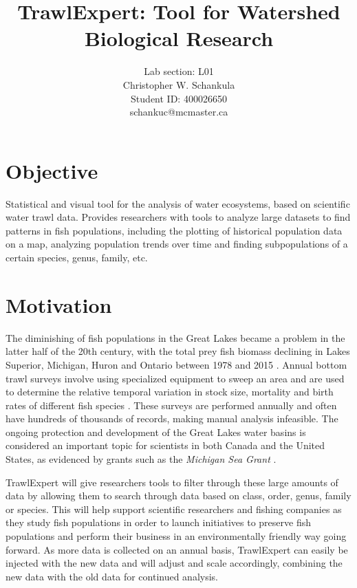 \documentclass{article}
\begin{document}
\title{TrawlExpert: Tool for Watershed Biological Research}
\author{Lab section: L01 \\ Christopher W. Schankula \\Student ID: 400026650 \\schankuc@mcmaster.ca}

\maketitle

\section{Objective}
Statistical and visual tool for the analysis of water ecosystems, based on scientific water trawl data. Provides researchers with tools to analyze large datasets to find patterns in fish populations, including the plotting of historical population data on a map, analyzing population trends over time and finding subpopulations of a certain species, genus, family, etc.

\section{Motivation}
The diminishing of fish populations in the Great Lakes became a problem in the latter half of the 20th century, with the total prey fish biomass declining in Lakes Superior, Michigan, Huron and Ontario between 1978 and 2015 \citep{michigan2017}. Annual bottom trawl surveys involve using specialized equipment to sweep an area and are used to determine the relative temporal variation in stock size, mortality and birth rates of different fish species \citep{walsh1997efficiency}. These surveys are performed annually and often have hundreds of thousands of records, making manual analysis infeasible. The ongoing protection and development of the Great Lakes water basins is considered an important topic for scientists in both Canada and the United States, as evidenced by grants such as the \textit{Michigan Sea Grant} \citep{michseagr2018}.

TrawlExpert will give researchers tools to filter through these large amounts of data by allowing them to search through data based on class, order, genus, family or species. This will help support scientific researchers and fishing companies as they study fish populations in order to launch initiatives to preserve fish populations and perform their business in an environmentally friendly way going forward. As more data is collected on an annual basis, TrawlExpert can easily be injected with the new data and will adjust and scale accordingly, combining the new data with the old data for continued analysis.
\end{document}

